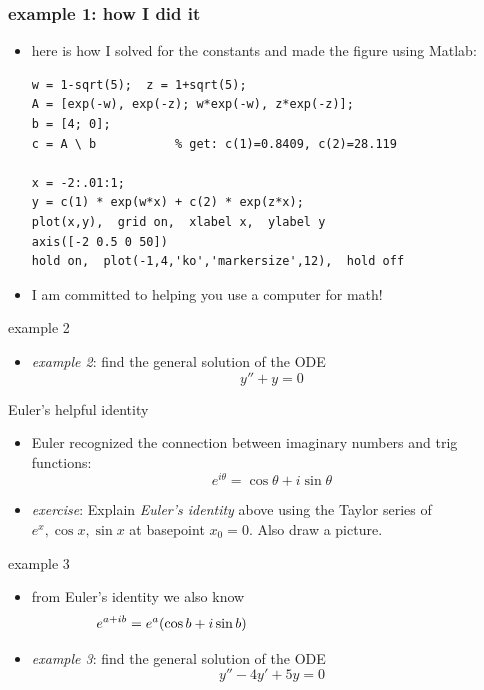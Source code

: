 \documentclass{beamer}
\begin{document}
\begin{frame}[fragile]
\frametitle{example 1: how I did it}

\begin{itemize}
\item here is how I solved for the constants and made the figure using Matlab:

\bigskip
\begin{Verbatim}[fontsize=\small]
w = 1-sqrt(5);  z = 1+sqrt(5);
A = [exp(-w), exp(-z); w*exp(-w), z*exp(-z)];
b = [4; 0];
c = A \ b           % get: c(1)=0.8409, c(2)=28.119

x = -2:.01:1;
y = c(1) * exp(w*x) + c(2) * exp(z*x); 
plot(x,y),  grid on,  xlabel x,  ylabel y
axis([-2 0.5 0 50])
hold on,  plot(-1,4,'ko','markersize',12),  hold off
\end{Verbatim}

\bigskip
\item I am committed to helping you use a computer for math!

\end{itemize}
\end{frame}


\begin{frame}{example 2}

\begin{itemize}
\item \emph{example 2}: find the general solution of the ODE
    $$y'' + y = 0$$
\end{itemize}

\vspace{55mm}
\end{frame}


\begin{frame}{Euler's helpful identity}

\begin{itemize}
\item Euler recognized the connection between imaginary numbers and trig functions:
    $$e^{i\theta} = \cos\theta + i \sin\theta$$
\item \emph{exercise}: Explain \emph{Euler's identity} above using the Taylor series of $e^x,\cos x,\sin x$ at basepoint $x_0=0$.  Also draw a picture.
\end{itemize}

\vspace{50mm}
\end{frame}


\begin{frame}{example 3}

\begin{itemize}
\item from Euler's identity we also know
    $$e^{a+ib} = e^a(\cos b + i \sin b) \hspace{50mm}$$
\item \emph{example 3}: find the general solution of the ODE
    $$y''-4y'+5y=0$$
\end{itemize}

\vspace{50mm}
\end{frame}
\end{document}
